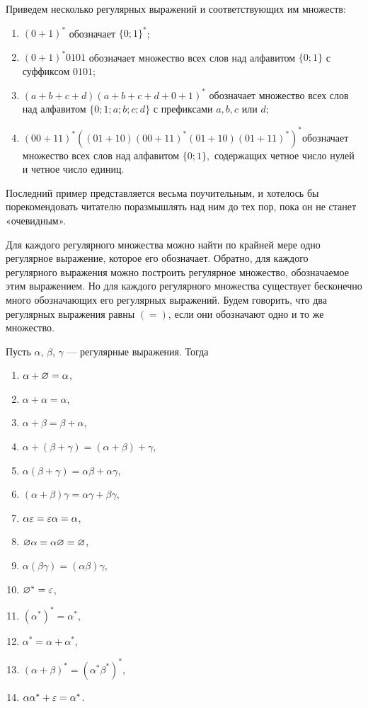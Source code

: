 \begin{myexample}
Приведем несколько регулярных выражений и соответствующих им множеств:
\begin{enumerate}
	\item $(0+1)^*$ обозначает $\{0;1\}^*$;
	\item $(0+1)^*0101$ обозначает множество всех слов над алфавитом $\{0;1\}$ с суффиксом $0101$;
	\item $(a+b+c+d)(a+b+c+d+0+1)^*$ обозначает множество всех слов над алфавитом $\{0;1;a;b;c;d\}$ с префиксами $a, b, c$ или $d$;
	\item $(00+11)^*((01+10)(00+11)^*(01+10)(01+11)^*)^* $обозначает множество всех слов над алфавитом $\{0;1\},$ содержащих четное число нулей и четное число единиц.
\end{enumerate}

Последний пример представляется весьма поучительным, и хотелось бы порекомендовать читателю поразмышлять над ним до тех пор, пока он не станет «очевидным».
\end{myexample}

Для каждого регулярного множества можно найти по крайней мере одно регулярное выражение, которое его обозначает. Обратно, для каждого регулярного выражения можно построить регулярное множество, обозначаемое этим выражением. Но для каждого регулярного множества существует бесконечно много обозначающих его регулярных выражений. Будем говорить, что два регулярных выражения равны $(=)$, если они обозначают одно и то же множество.

\begin{mylemma}
\label{LemmaRegExprFeat}
Пусть $\alpha$, $\beta$, $\gamma$ --- регулярные выражения. Тогда
\begin{multicols}{2}
\begin{enumerate}
	\item $\alpha+\varnothing=\alpha$,
	\item $\alpha+\alpha=\alpha$,
	\item $\alpha+\beta=\beta+\alpha$,
	\item $\alpha+(\beta+\gamma)=(\alpha+\beta)+\gamma$,
	\item $\alpha(\beta+\gamma)=\alpha\beta+\alpha\gamma$,
	\item $(\alpha+\beta)\gamma=\alpha\gamma+\beta\gamma$,
	\item $\alpha\varepsilon=\varepsilon\alpha=\alpha$,
	\item $\varnothing\alpha=\alpha\varnothing=\varnothing$,
	\item $\alpha(\beta\gamma)=(\alpha\beta)\gamma$,
	\item $\varnothing^*=\varepsilon$,
	\item $(\alpha^*)^*=\alpha^*$,
	\item $\alpha^*=\alpha+\alpha^*$,
	\item $(\alpha+\beta)^*=(\alpha^*\beta^*)^*$,
	\item $\alpha\alpha^*+\varepsilon=\alpha^*$.
\end{enumerate}
\end{multicols}
\end{mylemma}

